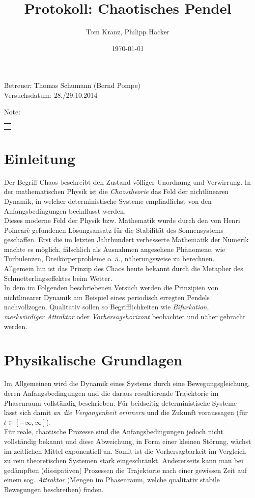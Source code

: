 \documentclass[numbers=noenddot,12pt,a4paper]{scrartcl}
\title{Protokoll: Chaotisches Pendel}
\author{Tom Kranz, Philipp Hacker}
\date{\today}
\newcommand{\tilt}[1]{\textit{#1}}
\begin{document}
\maketitle
\begin{center}
Betreuer: Thomas Schumann (Bernd Pompe)\\
Versuchsdatum: 28./29.10.2014\\
\begin{table}[H]
\centering
Note:
\begin{tabularx}{1.5cm}{|X|}
\hline \\ \\
\hline
\end{tabularx}
\end{table}
\end{center}
\vspace*{\fill}
\tableofcontents
\vfill
\newpage
\section{Einleitung}
Der Begriff Chaos beschreibt den Zustand völliger Unordnung und Verwirrung. In der mathematischen Physik ist die \tilt{Chaostheorie} das Feld der nichtlinearen Dynamik, in welcher deterministische Systeme empfindlichst von den Anfangsbedingungen beeinflusst werden.\\
Dieses moderne Feld der Physik bzw. Mathematik wurde durch den von Henri Poincarè gefundenen Lösungsansatz für die Stabilität des Sonnensystems geschaffen. Erst die im letzten Jahrhundert verbesserte Mathematik der Numerik machte es möglich, fälschlich als Ausnahmen angesehene Phänomene, wie Turbulenzen, Dreikörperprobleme o. ä., näherungsweise zu berechnen.\\
Allgemein hin ist das Prinzip des Chaos heute bekannt durch die Metapher des Schmetterlingseffektes beim Wetter.\\
In dem im Folgenden beschriebenen Versuch werden die Prinzipien von nichtlinearer Dynamik am Beispiel eines periodisch erregten Pendels nachvollzogen. Qualitativ sollen so Begrifflichkeiten wie \tilt{Bifurkation}, \tilt{merkwürdiger Attraktor} oder \tilt{Vorhersagehorizont} beobachtet und näher gebracht werden.
\section{Physikalische Grundlagen}
Im Allgemeinen wird die Dynamik eines Systems durch eine Bewegungsgleichung, deren Anfangsbedingungen und die daraus resultierende Trajektorie im Phasenraum vollständig beschrieben. Für beidseitig deterministische Systeme lässt sich damit \tilt{an die Vergangenheit erinnern} und die Zukunft voraussagen (für $t\in\left[-\infty,\infty\right]$).\\
Für reale, chaotische Prozesse sind die Anfangsbedingungen jedoch nicht vollständig bekannt und diese Abweichung, in Form einer kleinen Störung, wächst im zeitlichen Mittel exponentiell an. Somit ist die Vorhersagbarkeit im Vergleich zu rein theoretischen Systemen stark eingeschränkt. Andererseits kann man bei gedämpften (dissipativen) Prozessen die Trajektorie nach einer gewissen Zeit auf einem sog. \tilt{Attraktor} (Mengen im Phasenraum, welche qualitativ stabile Bewegungen beschreiben) finden.
\newpage
\end{document}
